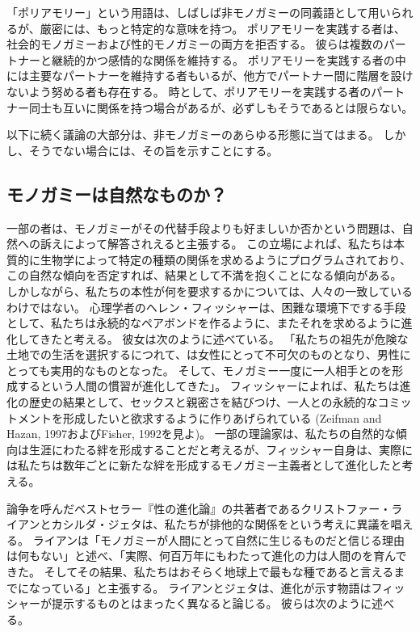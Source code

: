 \documentclass[paper=a4,book,openany]{jlreq} \usepackage{mystyle}
\begin{document}
「ポリアモリー」という用語は、しばしば非モノガミーの同義語として用いられるが、厳密には、もっと特定的な意味を持つ。
ポリアモリーを実践する者は、社会的モノガミーおよび性的モノガミーの両方を拒否する。
彼らは複数のパートナーと継続的かつ感情的な関係を維持する。
ポリアモリーを実践する者の中には主要なパートナーを維持する者もいるが、他方でパートナー間に階層を設けないよう努める者も存在する。
時として、ポリアモリーを実践する者のパートナー同士も互いに関係を持つ場合があるが、必ずしもそうであるとは限らない。

以下に続く議論の大部分は、非モノガミーのあらゆる形態に当てはまる。
しかし、そうでない場合には、その旨を示すことにする。

\subsection{モノガミーは自然なものか？}

一部の者は、モノガミーがその代替手段よりも好ましいか否かという問題は、自然への訴えによって解答されえると主張する。
この立場によれば、私たちは本質的に生物学によって特定の種類の関係を求めるようにプログラムされており、この自然な傾向を否定すれば、結果として不満を抱くことになる傾向がある。
しかしながら、私たちの本性が何を要求するかについては、人々の一致しているわけではない。
心理学者のヘレン・フィッシャーは、困難な環境下でする手段として、私たちは永続的なペアボンドを作るように、またそれを求めるように進化してきたと考える。
彼女は次のように述べている。
「私たちの祖先が危険な土地での生活を選択するにつれて、は女性にとって不可欠のものとなり、男性にとっても実用的なものとなった。
そして、モノガミー{\DDASH}一度に一人相手とのを形成するという人間の慣習{\DDASH}が進化してきた」\citep[p.131]{fisher04:_why_we_love}。
フィッシャーによれば、私たちは進化の歴史の結果として、セックスと親密さを結びつけ、一人との永続的なコミットメントを形成したいと欲求するように作りあげられている
(Zeifman and Hazan, 1997およびFisher, 1992を見よ)。
\nocite{zeifman97:_proces_model_adult_attac_format}\nocite{fisher92:_anatom_love}
一部の理論家は、私たちの自然的な傾向は生涯にわたる絆を形成することだと考えるが、フィッシャー自身は、実際には私たちは数年ごとに新たな絆を形成するモノガミー主義者として進化したと考える。

論争を呼んだベストセラー『性の進化論』\citep{ryan10:_sex_dawn}の共著者であるクリストファー・ライアンとカシルダ・ジェタは、私たちが排他的な関係をという考えに異議を唱える。
ライアンは「モノガミーが人間にとって自然に生じるものだと信じる理由は何もない」と述べ、「実際、何百万年にもわたって進化の力は人間のを育んできた。
そしてその結果、私たちはおそらく地球上で最もな種であると言えるまでになっている」と主張する\citep{ryan10:_monog_unnat_our_sexy_species}。
ライアンとジェタは、進化が示す物語はフィッシャーが提示するものとはまったく異なると論じる。
彼らは次のように述べる。
\end{document}
